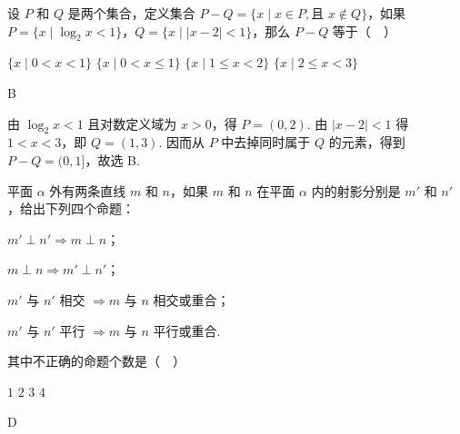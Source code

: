 \begin{problem}
设 \(P\) 和 \(Q\) 是两个集合，定义集合 \(P - Q = \{x \mid x \in P, \text{且 } x \notin Q\}\)，如果 \(P = \{x \mid \log_2 x < 1\}\)，\(Q = \{x \mid |x - 2| < 1\}\)，那么 \(P - Q\) 等于（\(\quad\)）

\choices
    {\(\{x\mid 0 < x < 1\}\)}
    {\(\{x\mid 0 < x\leqslant 1\}\)}
    {\(\{x\mid 1\leqslant x < 2\}\)}
    {\(\{x\mid 2\leqslant x < 3\}\)}
\end{problem}

\begin{answer}
B
\end{answer}

\begin{solution}
由 \(\log_2x<1\) 且对数定义域为 \(x>0\)，得 \(P=(0,2)\). 由 \(|x-2|<1\) 得 \(1<x<3\)，即 \(Q=(1,3)\). 因而从 \(P\) 中去掉同时属于 \(Q\) 的元素，得到 \(P-Q=(0,1]\)，故选 B.
\end{solution}

\begin{problem}
平面 \(\alpha\) 外有两条直线 \(m\) 和 \(n\)，如果 \(m\) 和 \(n\) 在平面 \(\alpha\) 内的射影分别是 \(m'\) 和 \(n'\)，给出下列四个命题：

\begin{circlelist}
\item \(m' \perp n' \Rightarrow m \perp n\)；
\item \(m \perp n \Rightarrow m' \perp n'\)；
\item \(m'\) 与 \(n'\) 相交 \(\Rightarrow m\) 与 \(n\) 相交或重合；
\item \(m'\) 与 \(n'\) 平行 \(\Rightarrow m\) 与 \(n\) 平行或重合.
\end{circlelist}

其中不正确的命题个数是（\(\quad\)）

\choices
    {\(1\)}
    {\(2\)}
    {\(3\)}
    {\(4\)}
\end{problem}

\begin{answer}
D
\end{answer}

